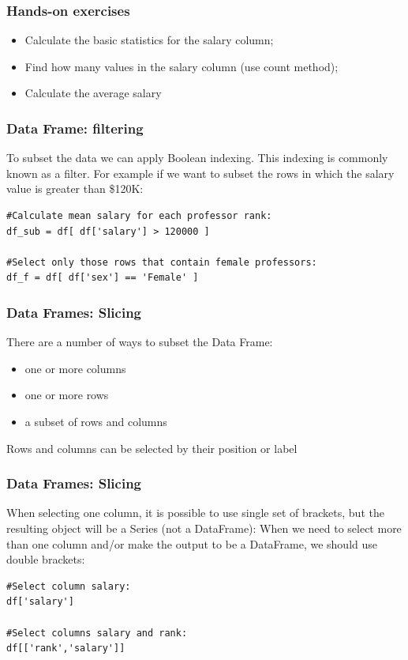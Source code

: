 \begin{frame}[fragile]
\frametitle{Hands-on exercises}
\begin{itemize}
\item Calculate the basic statistics for the salary column;
\item Find how many values in the salary column (use count method);
\item Calculate the average salary
\end{itemize}

\end{frame}


\begin{frame}[fragile]
\frametitle{Data Frame: filtering}
To subset the data we can apply Boolean indexing. This indexing is commonly known as a filter.  For example if we want to subset the rows in which the salary value is greater than \$120K: 

\begin{lstlisting}
#Calculate mean salary for each professor rank:
df_sub = df[ df['salary'] > 120000 ]

#Select only those rows that contain female professors:
df_f = df[ df['sex'] == 'Female' ]
\end{lstlisting}
\end{frame}

\begin{frame}[fragile]
\frametitle{Data Frames: Slicing}
There are a number of ways to subset the Data Frame:

\begin{itemize}
\item one or more columns
\item one or more rows
\item a subset of rows and columns
\end{itemize}
Rows and columns can be selected by their position or label 

\end{frame}


\begin{frame}[fragile]
\frametitle{Data Frames: Slicing}
When selecting one column, it is possible to use single set of brackets, but the resulting object will be a Series (not a DataFrame):
When we need to select more than one column and/or make the output to be a DataFrame, we should use double brackets:
\begin{lstlisting}
#Select column salary:
df['salary']

#Select columns salary and rank:
df[['rank','salary']]
\end{lstlisting}
\end{frame}


